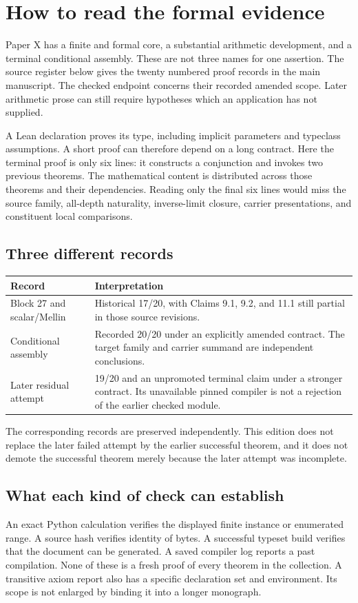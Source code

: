 \section{How to read the formal evidence}
\label{sec:evidence-reading}
Paper X has a finite and formal core, a substantial arithmetic development, and a
terminal conditional assembly. These are not three names for one assertion.
The source register below gives the twenty numbered proof records in the main
manuscript. The checked endpoint concerns their recorded amended scope. Later
arithmetic prose can still require hypotheses which an application has not supplied.

A Lean declaration proves its type, including implicit parameters and typeclass
assumptions. A short proof can therefore depend on a long contract. Here the
terminal proof is only six lines: it constructs a conjunction and invokes two
previous theorems. The mathematical content is distributed across those theorems
and their dependencies. Reading only the final six lines would miss the source
family, all-depth naturality, inverse-limit closure, carrier presentations, and
constituent local comparisons.

\subsection{Three different records}
\begin{longtable}{@{}p{.20\linewidth}p{.75\linewidth}@{}}\toprule
Record & Interpretation\\\midrule
Block 27 and scalar/Mellin & Historical 17/20, with Claims 9.1, 9.2, and 11.1 still partial in those source revisions.\\
Conditional assembly & Recorded 20/20 under an explicitly amended contract. The target family and carrier summand are independent conclusions.\\
Later residual attempt & 19/20 and an unpromoted terminal claim under a stronger contract. Its unavailable pinned compiler is not a rejection of the earlier checked module.\\\bottomrule
\end{longtable}
The corresponding records are preserved independently. This edition does not
replace the later failed attempt by the earlier successful theorem, and it does
not demote the successful theorem merely because the later attempt was incomplete.

\subsection{What each kind of check can establish}
An exact Python calculation verifies the displayed finite instance or enumerated
range. A source hash verifies identity of bytes. A successful typeset build verifies
that the document can be generated. A saved compiler log reports a past
compilation. None of these is a fresh proof of every theorem in the collection.
A transitive axiom report also has a specific declaration set and environment.
Its scope is not enlarged by binding it into a longer monograph.

